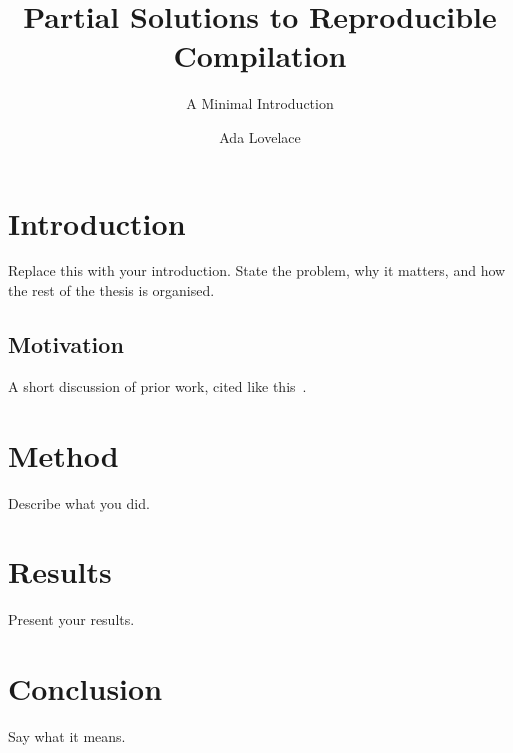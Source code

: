 \documentclass[type=master,theme=default,language=english,titlelanguage=english,smartquotes=true,updatecheck=false]{hgbthesis}
\begin{document}
\title{Partial Solutions to Reproducible Compilation}
\subtitle{A Minimal Introduction}
\author{Ada Lovelace}





\frontmatter
\maketitle
\tableofcontents

\mainmatter

\chapter{Introduction}
Replace this with your introduction. State the problem, why it matters, and
how the rest of the thesis is organised.

\section{Motivation}
A short discussion of prior work, cited like this~\autocite{knuth1984texbook}.

\chapter{Method}
Describe what you did.

\chapter{Results}
Present your results.

\chapter{Conclusion}
Say what it means.

\backmatter
\MakeBibliography
\end{document}

